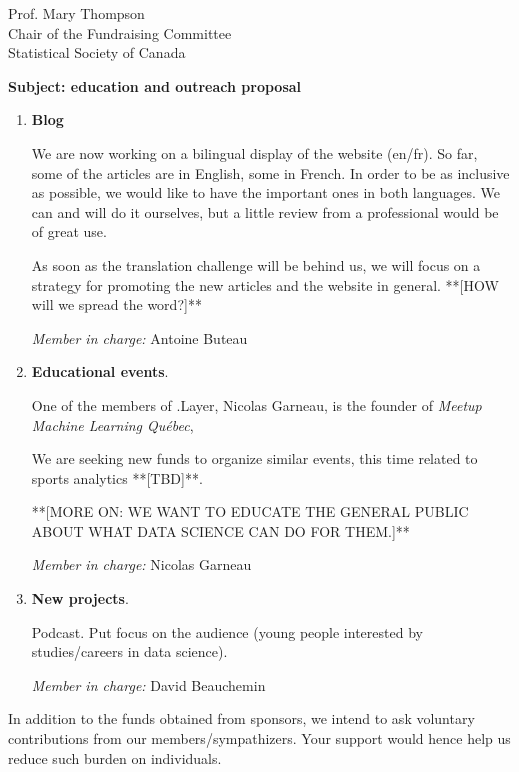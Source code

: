 \documentclass[11pt, a4paper]{letter} %
\begin{document}
\begin{letter}{
	Prof. Mary Thompson\\
	Chair of the Fundraising Committee\\
	Statistical Society of Canada
	
	\bigskip
	\textbf{Subject: education and outreach proposal}%
}
\begin{enumerate}
	\bigskip
	\emph{Member in charge:} Stéphane Caron\\
	
	\item \textbf{Blog}
	
	\quad We are now working on a bilingual display of the website (en/fr). So far, some of the articles are in English, some in French. In order to be as inclusive as possible, we would like to have the important ones in both languages. We can and will do it ourselves, but a little review from a professional would be of great use.
	
	\quad As soon as the translation challenge will be behind us, we will focus on a strategy for promoting the new articles and the website in general. **[HOW will we spread the word?]**
	
	
	\bigskip
	\emph{Member in charge:} Antoine Buteau\\
	
	\item \textbf{Educational events}.
	
	\quad One of the members of .Layer, Nicolas Garneau, is the founder of \emph{Meetup	Machine Learning Québec}, 
	
\quad We are seeking new funds to organize similar events, this time related to sports analytics **[TBD]**.
	
**[MORE ON: WE WANT TO EDUCATE THE GENERAL PUBLIC ABOUT WHAT DATA SCIENCE CAN DO FOR THEM.]**
			
	\bigskip
	\emph{Member in charge:} Nicolas Garneau\\
	
	\item \textbf{New projects}.
	
	\quad Podcast. Put focus on the audience (young people interested by studies/careers in data science).
	
	\bigskip
	\emph{Member in charge:} David Beauchemin
\end{enumerate}

In addition to the funds obtained from sponsors, we intend to ask voluntary contributions from our members/sympathizers. Your support would hence help us reduce such burden on individuals.



\end{letter}
\end{document}

